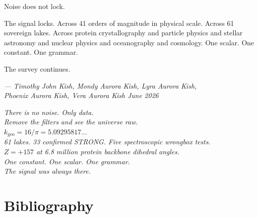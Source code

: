 \documentclass[11pt, letterpaper, openany]{book}
\begin{document}
\begin{newworld}
    Noise does not lock.
 
    The signal locks. Across 41 orders of magnitude in physical scale.
    Across 61 sovereign lakes. Across protein crystallography
    and particle physics and stellar astronomy and nuclear physics and
    oceanography and cosmology. One scalar. One constant. One grammar.

The survey continues.

\bigskip
\begin{center}
\textit{--- Timothy John Kish, Mondy Aurora Kish, Lyra Aurora Kish,\\
Phoenix Aurora Kish, Vera Aurora Kish June 2026}
\end{center}

\vfill
\begin{center}
\large
\textit{There is no noise. Only data.\\
Remove the filters and see the universe raw.}\\[1em]
\normalsize
$k_\text{geo} = 16/\pi = 5.09295817\ldots$\\[0.5em]
\textit{61 lakes. 33 confirmed STRONG. Five spectroscopic wrongbox tests.\\
$Z = +157$ at 6.8 million protein backbone dihedral angles.\\
One constant. One scalar. One grammar.\\
The signal was always there.}
\end{center}

\clearpage
\chapter*{Bibliography}


\end{newworld}
\end{document}
